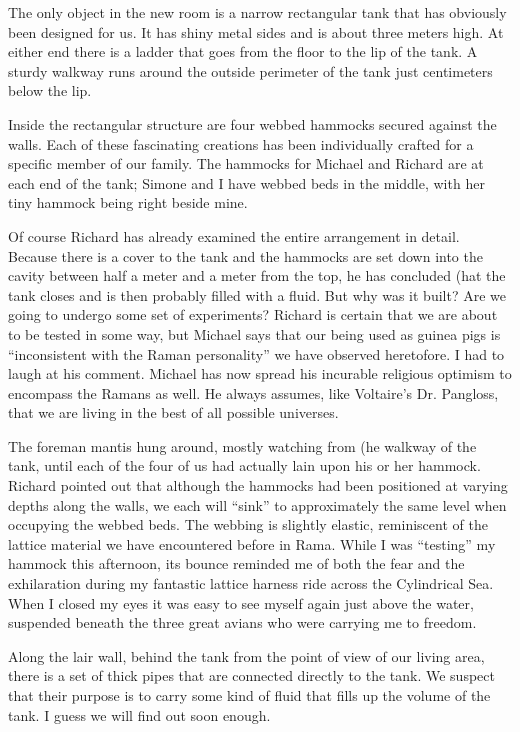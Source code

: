 \documentclass[]{article}
\begin{document}
The only object in the new room is a narrow rectangular tank that has obviously been designed for us.  It has shiny metal sides and is about three meters high.  At either end there is a ladder that goes from the floor to the lip of the tank.  A sturdy walkway runs around the outside perimeter of the tank just centimeters below the lip.

Inside the rectangular structure are four webbed hammocks secured against the walls.  Each of these fascinating creations has been individually crafted for a specific member of our family.  The hammocks for Michael and Richard are at each end of the tank; Simone and I have webbed beds in the middle, with her tiny hammock being right beside mine.

Of course Richard has already examined the entire arrangement in detail.  Because there is a cover to the tank and the hammocks are set down into the cavity between half a meter and a meter from the top, he has concluded (hat the tank closes and is then probably filled with a fluid.  But why was it built? Are we going to undergo some set of experiments? Richard is certain that we are about to be tested in some way, but Michael says that our being used as guinea pigs is “inconsistent with the Raman personality” we have observed heretofore.  I had to laugh at his comment.  Michael has now spread his incurable religious optimism to encompass the Ramans as well.  He always assumes, like Voltaire’s Dr.  Pangloss, that we are living in the best of all possible universes.

The foreman mantis hung around, mostly watching from (he walkway of the tank, until each of the four of us had actually lain upon his or her hammock.  Richard pointed out that although the hammocks had been positioned at varying depths along the walls, we each will “sink” to approximately the same level when occupying the webbed beds.  The webbing is slightly elastic, reminiscent of the lattice material we have encountered before in Rama.  While I was “testing” my hammock this afternoon, its bounce reminded me of both the fear and the exhilaration during my fantastic lattice harness ride across the Cylindrical Sea.  When I closed my eyes it was easy to see myself again just above the water, suspended beneath the three great avians who were carrying me to freedom.

Along the lair wall, behind the tank from the point of view of our living area, there is a set of thick pipes that are connected directly to the tank.  We suspect that their purpose is to carry some kind of fluid that fills up the volume of the tank.  I guess we will find out soon enough.
\end{document}
